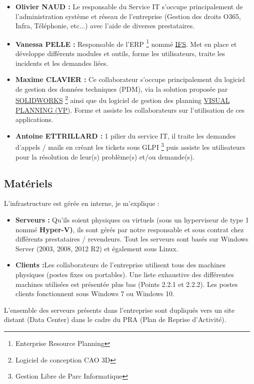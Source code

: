 \documentclass[11pt,a4paper,oneside]{article}
\begin{document}
\begin{itemize}
    \item \textbf{Olivier NAUD :} Le responsable du Service IT s'occupe principalement de l'administration système et réseau de l'entreprise (Gestion des droits O365, Infra, Téléphonie, etc...) avec l'aide de diverses prestataires. \\
    \item \textbf{Vanessa PELLE :} Responsable de l'ERP \footnote{Enterprise Resource Planning} nommé \hyperlink{https://www.ifsworld.com/fr/}{IFS}. Met en place et développe  différents modules et outils, forme les utilisateurs, traite les incidents et les demandes liées. \\
    \item \textbf{Maxime CLAVIER :} Ce collaborateur s’occupe principalement du logiciel de gestion des données techniques (PDM), via la solution proposée par \hyperlink{https://www.solidworks.com/fr}{SOLIDWORKS} \footnote{Logiciel de conception CAO 3D} ainsi que du logiciel de gestion des planning \hyperlink{https://www.visual-planning.com/fr/}{VISUAL PLANNING  (VP)}. Forme et assiste les collaborateurs sur l’utilisation de ces applications.\\
    \item \textbf{Antoine ETTRILLARD :} 1\ier{} pilier du service IT, il traite les demandes d'appels / mails en créant les tickets sous GLPI \footnote{Gestion Libre de Parc Informatique} puis assiste les utilisateurs pour la résolution de leur(s) problème(s) et/ou demande(s).
\end{itemize}
   
\subsection{Matériels}
L'infrastructure est gérée en interne, je m'explique :

\begin{itemize}
    \item \textbf{Serveurs :} Qu'ils soient physiques ou virtuels (sous un hyperviseur de type 1 nommé \textbf{Hyper-V)}, ils sont gérés par notre responsable et sous contrat chez différents prestataires / revendeurs. Tout les serveurs sont basés sur Windows Server (2003, 2008, 2012 R2) et également sous Linux.\\
    \item \textbf{Clients :}Les collaborateurs de l’entreprise utilisent tous des machines physiques (postes fixes ou portables). Une liste exhaustive des différentes machines utilisées est présentée plus bas (Points 2.2.1 et 2.2.2). Les postes clients fonctionnent sous Windows 7 ou Windows 10. \\
\end{itemize}
L’ensemble des serveurs présents dans l’entreprise sont dupliqués vers un site distant (Data Center) dans le cadre du PRA (Plan de Reprise d’Activité).
\end{document}
